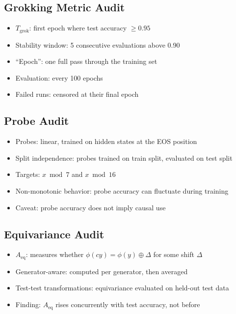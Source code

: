 \documentclass[11pt,a4paper]{article}
\newcommand{\Aeq}{A_{\mathrm{eq}}}
\begin{document}
\subsection{Grokking Metric Audit}

\begin{itemize}
\item $T_{\mathrm{grok}}$: first epoch where test accuracy $\geq 0.95$
\item Stability window: 5 consecutive evaluations above 0.90
\item ``Epoch'': one full pass through the training set
\item Evaluation: every 100 epochs
\item Failed runs: censored at their final epoch
\end{itemize}

\subsection{Probe Audit}

\begin{itemize}
\item Probes: linear, trained on hidden states at the EOS position
\item Split independence: probes trained on train split, evaluated on test split
\item Targets: $x \bmod 7$ and $x \bmod 16$
\item Non-monotonic behavior: probe accuracy can fluctuate during training
\item Caveat: probe accuracy does not imply causal use
\end{itemize}

\subsection{Equivariance Audit}

\begin{itemize}
\item $\Aeq$: measures whether $\phi(cy) = \phi(y) \oplus \Delta$ for some shift $\Delta$
\item Generator-aware: computed per generator, then averaged
\item Test-test transformations: equivariance evaluated on held-out test data
\item Finding: $\Aeq$ rises concurrently with test accuracy, not before
\end{itemize}
\end{document}
